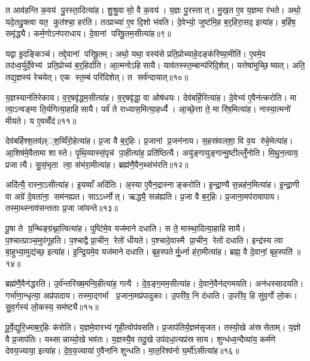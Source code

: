 त आव॑हन्ति क॒वय॑ पु॒रस्ता॒दित्या॑ह। शु॒श्रु॒वासो॒ वै क॒वय॑। य॒ज्ञः पु॒रस्तात्। मु॒ख॒त ए॒व य॒ज्ञमा र॑भते। अथो॒ यदे॒तदु॒क्त्वा यत॒ कुत॑श्चा॒ हर॑ति। तत्प्राच्या॑ ए॒व दि॒शो भ॑वति। दे॒वेभ्यो॒ जुष्ट॑मि॒ह ब॒र्॒हिरा॒सद॒ इत्या॑ह। ब॒र्\mbox{}हिष॒ समृ॑द्ध्यै। कर्म॒णोऽन॑पराधाय। दे॒वानां परिषू॒तम॒सीत्या॑ह॥९॥

यद्वा इ॒दङ्किञ्च॑। तद्दे॒वानां परिषू॒तम्। अथो॒ यथा॒ वस्य॑से प्रति॒प्रोच्याहे॒दङ्क॑रिष्या॒मीति॑। ए॒वमे॒व तद॑ध्व॒र्युर्दे॒वेभ्य॑ प्रति॒प्रोच्य॑ ब॒र्॒हिर्दा॑ति। आ॒त्मनोऽहिसायै। याव॑तस्स्त॒म्बान्प॑रिदि॒शेत्। यत्तेषा॑मुच्छि॒ष्यात्। अति॒ तद्य॒ज्ञस्य॑ रेचयेत्। एक स्त॒म्बं परि॑दिशेत्। त सर्व॑न्दायात्॥१०॥

य॒ज्ञस्यान॑तिरेकाय। व॒र्॒षवृ॑द्धम॒सीत्या॑ह। व॒र्॒षवृ॑द्धा॒ वा ओष॑धयः। देव॑बर्\mbox{}हि॒रित्या॑ह। दे॒वेभ्य॑ ए॒वैन॑त्करोति। मा त्वा॒ऽन्वङ्मा ति॒र्यगित्या॒हाहिसायै। पर्व॑ ते राध्यास॒मित्या॒हर्ध्यै। आ॒च्छे॒त्ता ते॒ मा रि॑ष॒मित्या॑ह। नास्या॒त्मनो॑ मीयते। य ए॒वव्वेँद॑॥११॥

देव॑बर्\mbox{}हिश्श॒तव॑ल़््श॒व्विँरो॒हेत्या॑ह। प्र॒जा वै ब॒र्॒हिः। प्र॒जानां प्र॒जन॑नाय। स॒हस्र॑वल्‌शा॒ वि व॒य रु॑हे॒मेत्या॑ह। आ॒शिष॑मे॒वैतामा शास्ते। पृ॒थि॒व्यास्सं॒पृच॑ पा॒हीत्या॑ह॒ प्रति॑ष्ठित्यै। अयु॑ङ्गायुङ्गान्मु॒ष्टील्लुँ॑नोति। मि॒थु॒न॒त्वाय॒ प्रजात्यै। सु॒सं॒भृता त्वा॒ संभ॑रा॒मीत्या॑ह। ब्रह्म॑णै॒वैन॒थ्संभ॑रति॥१२॥

अदि॑त्यै॒ रास्ना॒ऽसीत्या॑ह। इ॒यव्वाँ अदि॑तिः। अ॒स्या ए॒वैन॒द्रास्नाङ्करोति। इ॒न्द्रा॒ण्यै स॒न्नह॑न॒मित्या॑ह। इ॒न्द्रा॒णी वा अग्रे॑ दे॒वता॑ना॒ सम॑नह्यत। साऽऽर्ध्नोत्। ऋद्ध्यै॒ सन्न॑ह्यति। प्र॒जा वै ब॒र्॒हिः। प्र॒जाना॒मप॑रावापाय। तस्मा॒थ्स्नाव॑सन्तताः प्र॒जा जा॑यन्ते॥१३॥

पू॒षा ते ग्र॒न्थिङ्ग्र॑थ्ना॒त्वित्या॑ह। पुष्टि॑मे॒व यज॑माने दधाति। स ते॒ मास्था॒दित्या॒हाहिसायै। प॒श्चात्प्राञ्च॒मुप॑गूहति। प॒श्चाद्वै प्रा॒चीन॒ रेतो॑ धीयते। प॒श्चादे॒वास्मै प्रा॒चीन॒ रेतो॑ दधाति। इन्द्र॑स्य त्वा बा॒हुभ्या॒मुद्य॑च्छ॒ इत्या॑ह। इ॒न्द्रि॒यमे॒व यज॑माने दधाति। बृह॒स्पतेर्मू॒र्ध्ना ह॑रा॒मीत्या॑ह। ब्रह्म॒ वै दे॒वानां॒ बृह॒स्पति॑॥१४॥

ब्रह्म॑णै॒वैन॑द्धरति। उ॒र्व॑न्तरि॑ख्ष॒मन्वि॒हीत्या॑ह॒ गत्यै। दे॒व॒ङ्ग॒मम॒सीत्या॑ह। दे॒वाने॒वैन॑द्गमयति। अन॑धस्सादयति। गर्भा॑णा॒न्धृत्या॒ अप्र॑पादाय। तस्मा॒द्गर्भा प्र॒जाना॒मप्र॑पादुकाः। उ॒परी॑व॒ नि द॑धाति। उ॒परी॑व॒ हि सु॑व॒र्गो लो॒कः। सु॒व॒र्गस्य॑ लो॒कस्य॒ सम॑ष्ट्यै॥१५॥\anuvakamend[स॒यो॒नि॒त्वाय॑ स्व॒धाकृ॑ता॒ऽसीत्या॑ह दाया॒द्वेद॑ भरति जायन्ते॒ बृह॒स्पति॒ सम॑ष्ट्यै]

पू॒र्वे॒द्युरि॒ध्माब॒र्॒हिः क॑रोति। य॒ज्ञमे॒वारभ्य॑ गृही॒त्वोप॑वसति। प्र॒जाप॑तिर्य॒ज्ञम॑सृजत। तस्यो॒खे अ॑स्रसेताम्। य॒ज्ञो वै प्र॒जाप॑तिः। यथ्सान्नाय्यो॒खे भव॑तः। य॒ज्ञस्यै॒व तदु॒खे उप॑दधा॒त्यप्र॑स्रसाय। शुन्ध॑ध्व॒न्दैव्या॑य॒ कर्म॑णे देवय॒ज्याया॒ इत्या॑ह। दे॒व॒य॒ज्याया॑ ए॒वैना॑नि शुन्धति। मा॒त॒रिश्व॑नो घ॒र्मो॑ऽसीत्या॑ह॥१६॥

